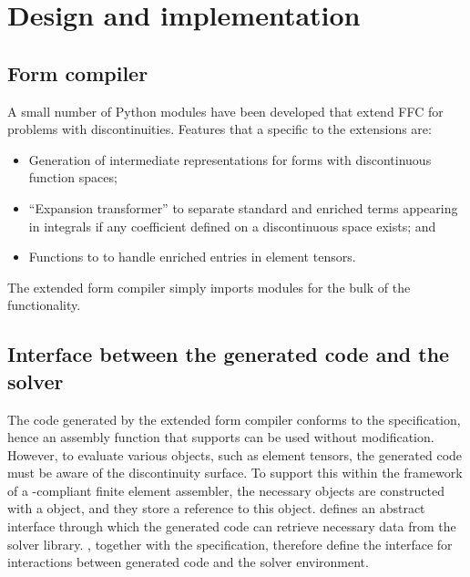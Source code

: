 \section{Design and implementation}
\subsection{Form compiler}

A small number of Python modules have been developed that extend FFC
for problems with discontinuities. Features that a specific to the
extensions are:
%
\begin{itemize}
  \item Generation of intermediate representations for forms with
  discontinuous function spaces;

  \item ``Expansion transformer'' to separate standard and enriched terms
  appearing in integrals if any coefficient defined on a discontinuous
  space exists; and

  \item Functions to to handle enriched entries in element tensors.
\end{itemize}
%
The extended form compiler simply imports \ffc{} modules for the
bulk of the functionality.
\subsection{Interface between the generated code and the solver}

The code generated by the extended form compiler conforms to the
\ufc{} specification, hence an assembly function that supports \ufc{}
can be used without modification.  However, to evaluate various
objects, such as element tensors, the generated code must be aware
of the discontinuity surface. To support this within the framework
of a \ufc{}-compliant finite element assembler, the necessary \ufc{}
objects are constructed with a  object, and they store a
reference to this object.   defines an abstract interface
through which the generated code can retrieve necessary data from the
solver library. , together with the \ufc{} specification,
therefore define the interface for interactions between generated code
and the solver environment.

